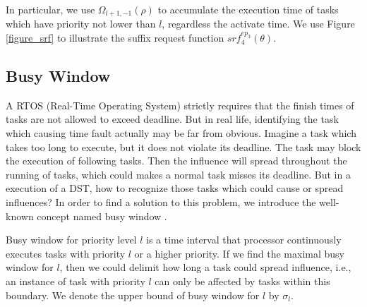 \documentclass[sigconf]{acmart}
\begin{document}
In particular, we use $\Omega_{l+1,-1}(\rho)$ to accumulate the execution time of tasks which have priority not lower than $l$, regardless the activate time. We use Figure \ref{figure_srf} to illustrate the suffix request function $srf^{ep_3}_{4}(\theta)$.



\subsection{Busy Window}\label{section_busywindow}

A RTOS (Real-Time Operating System) strictly requires that the finish times of tasks are not allowed to exceed deadline. But in real life, identifying the task which causing time fault actually may be far from obvious. Imagine a task which takes too long to execute, but it does not violate its deadline. The task may block the execution of following tasks. Then the influence will spread throughout the running of tasks, which could makes a normal task misses its deadline. But in a execution of a DST, how to recognize those tasks which could cause or spread influences? 
In order to find a solution to this problem, we introduce the well-known concept named busy window \cite{DBLP:conf/rtss/Lehoczky90}. 

Busy window for priority level $l$ is a time interval that processor continuously executes tasks with priority $l$ or a higher priority. If we find the maximal busy window for $l$, then we could delimit how long a task could spread influence, i.e., an instance of task with priority $l$ can only be affected by tasks within this boundary. We denote the upper bound of busy window for $l$ by $\sigma_l$. %
\end{document}
